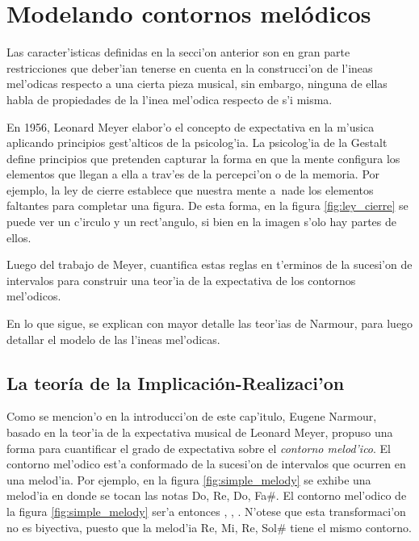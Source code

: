 \section{Modelando contornos mel\'odicos}
\label{sec:melodic_contour}
Las caracter'isticas definidas en la secci'on anterior son en gran parte restricciones que deber'ian tenerse en cuenta en la construcci'on 
de l'ineas mel'odicas respecto a una cierta pieza musical, sin embargo, ninguna de ellas habla de propiedades de la l'inea mel'odica 
respecto de s'i misma.

En 1956, Leonard Meyer elabor'o el concepto de expectativa en la m'usica aplicando principios gest'alticos de la psicolog'ia. La 
psicolog'ia de la Gestalt define principios que pretenden capturar la forma en que la mente configura los elementos que llegan a ella a trav'es 
de la percepci'on o de la memoria. Por ejemplo, la ley de cierre establece que nuestra mente a~nade los elementos faltantes para completar una 
figura. De esta forma, en la figura \ref{fig:ley_cierre} se puede ver un c'irculo y un rect'angulo, si bien en la imagen s'olo hay partes de ellos.

\begin{imagen}
    \width{6cm}
\end{imagen}

Luego del trabajo de Meyer, \cite{Narmour90} cuantifica estas reglas en t'erminos de la sucesi'on de intervalos para construir una teor'ia de 
la expectativa de los contornos mel'odicos. 

En lo que sigue, se explican con mayor detalle las teor'ias de Narmour, para luego detallar el modelo de las l'ineas mel'odicas.

\subsection{La teor\'ia de la Implicaci\'on-Realizaci'on}
Como se mencion'o en la introducci'on de este cap'itulo, Eugene Narmour, basado en la teor'ia de la expectativa musical de Leonard Meyer, propuso una forma para cuantificar
el grado de expectativa sobre el \emph{contorno melod'ico}. El contorno mel'odico est'a conformado de la sucesi'on de intervalos que ocurren en una melod'ia. Por ejemplo, 
en la figura \ref{fig:simple_melody} se exhibe una melod'ia en donde se tocan las notas Do, Re, Do, Fa\#. 
El contorno mel'odico de la figura \ref{fig:simple_melody} ser'a entonces , , .
N'otese que esta transformaci'on no es biyectiva, puesto que la melod'ia Re, Mi, Re, Sol\# tiene el mismo contorno.

